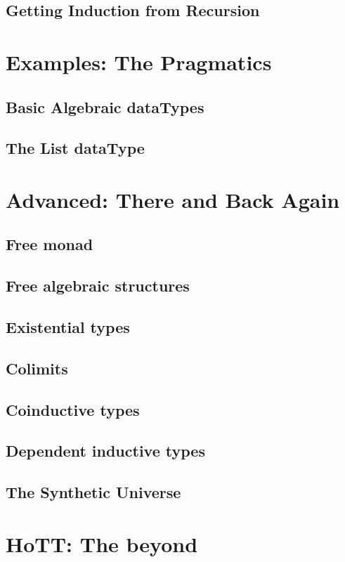 \documentclass[11pt,oneside]{article}
\begin{document}
\subsection{Getting Induction from Recursion}



\section{Examples: The Pragmatics}
\subsection{Basic Algebraic dataTypes}
\subsection{The List dataType}

\section{Advanced: There and Back Again}
\subsection{Free monad}
\subsection{Free algebraic structures}
\subsection{Existential types}
\subsection{Colimits}
\subsection{Coinductive types}
\subsection{Dependent inductive types}
\subsection{The Synthetic Universe}

\section{HoTT: The beyond}
\end{document}
